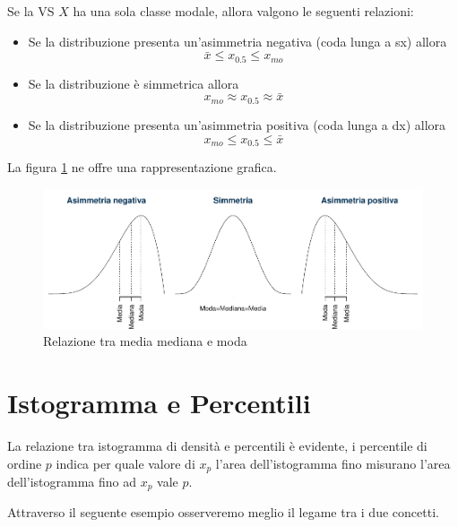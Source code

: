 \documentclass[
  11pt,
]{book}
\providecommand{\tightlist}{%
  \setlength{\itemsep}{0pt}\setlength{\parskip}{0pt}}
\theoremstyle{mytheoremstyle}
\theoremstyle{mydefstyle}
\begin{document}
\begin{info}

Se la VS \(X\) ha una sola classe modale, allora valgono le seguenti relazioni:

\begin{itemize}
\tightlist
\item
  Se la distribuzione presenta un'asimmetria negativa (coda lunga a sx) allora
  \[\bar x\le  x_{0.5} \le x_{mo}\]
\item
  Se la distribuzione è simmetrica allora
  \[x_{mo}\approx x_{0.5}\approx \bar x\]
\item
  Se la distribuzione presenta un'asimmetria positiva (coda lunga a dx) allora
  \[x_{mo}\le x_{0.5}\le \bar x\]
\end{itemize}

\end{info}

La figura \ref{fig:mmm} ne offre una rappresentazione grafica.

\begin{figure}[H]

{\centering \includegraphics{Appunti_di_Statistica_2025_files/figure-latex/mmm-1} 

}

\caption{Relazione tra media mediana e moda}\label{fig:mmm}
\end{figure}

\section{Istogramma e Percentili}\label{istogramma-e-percentili}

La relazione tra istogramma di densità e percentili è evidente, i percentile di ordine \(p\) indica per quale
valore di \(x_p\) l'area dell'istogramma fino misurano l'area dell'istogramma fino ad \(x_p\) vale \(p\).

Attraverso il seguente esempio osserveremo meglio il legame tra i due concetti.
\end{document}
